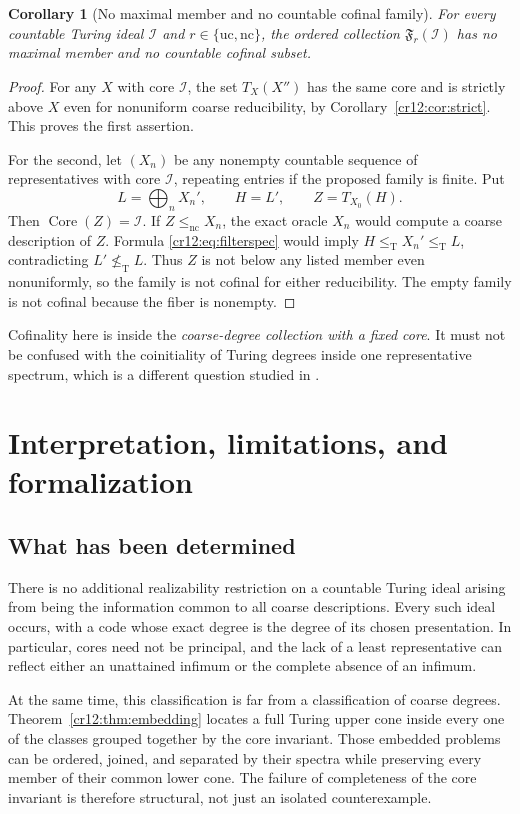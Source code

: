 \documentclass[11pt,letterpaper]{article}
\theoremstyle{plain}
\newtheorem{corollary}[theorem]{Corollary}
\theoremstyle{definition}
\theoremstyle{remark}
\numberwithin{equation}{section}
\newcommand{\leT}{\leq_{\mathrm T}}
\newcommand{\nleT}{\nleq_{\mathrm T}}
\newcommand{\lenc}{\leq_{\mathrm{nc}}}
\newcommand{\Core}{\operatorname{Core}}
\newcommand{\I}{\mathcal I}
\newcommand{\fiber}{\mathfrak F}
\begin{document}
\begin{corollary}[No maximal member and no countable cofinal family]\label{cr12:cor:cofinal}
For every countable Turing ideal $\I$ and
$r\in\{\mathrm{uc},\mathrm{nc}\}$, the ordered collection
$\fiber_r(\I)$ has no maximal member and no countable cofinal subset.
\end{corollary}
\begin{proof}
For any $X$ with core $\I$, the set $T_X(X'')$ has the same core and is
strictly above $X$ even for nonuniform coarse reducibility, by
Corollary~\ref{cr12:cor:strict}. This proves the first assertion.

For the second, let $(X_n)$ be any nonempty countable sequence of representatives
with core $\I$, repeating entries if the proposed family is finite. Put
\[
 L=\bigoplus_n X_n',\qquad H=L',\qquad Z=T_{X_0}(H).
\]
Then $\Core(Z)=\I$. If $Z\lenc X_n$, the exact oracle $X_n$ would compute a
coarse description of $Z$. Formula \eqref{cr12:eq:filterspec} would imply
$H\leT X_n'\leT L$, contradicting $L'\nleT L$.
Thus $Z$ is not below any listed member even nonuniformly, so the family is
not cofinal for either reducibility. The empty family is not cofinal because
the fiber is nonempty.
\end{proof}

Cofinality here is inside the \emph{coarse-degree collection with a fixed
core}. It must not be confused with the coinitiality of Turing degrees inside
one representative spectrum, which is a different question studied in
\cite{Repo}.

\section{Interpretation, limitations, and formalization}\label{cr12:sec:interpret}
\subsection{What has been determined}
There is no additional realizability restriction on a countable Turing ideal
arising from being the information common to all coarse descriptions. Every
such ideal occurs, with a code whose exact degree is the degree of its chosen
presentation. In particular, cores need not be principal, and the lack of a
least representative can reflect either an unattained infimum or the complete
absence of an infimum.

At the same time, this classification is far from a classification of coarse
degrees. Theorem~\ref{cr12:thm:embedding} locates a full Turing upper cone inside
every one of the classes grouped together by the core invariant. Those embedded
problems can be ordered, joined, and separated by their spectra while preserving
every member of their common lower cone. The failure of completeness of the
core invariant is therefore structural, not just an isolated counterexample.
\end{document}
